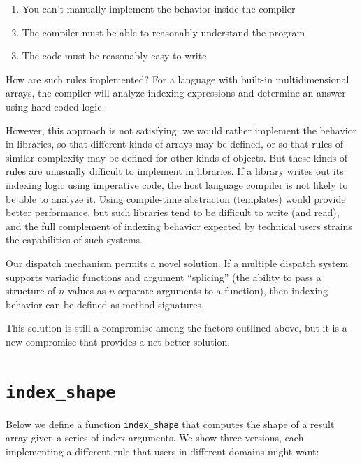 \documentclass[preprint]{sigplanconf}
\begin{document}
\begin{enumerate}
\item You can't manually implement the behavior inside the compiler
\item The compiler must be able to reasonably understand the program
\item The code must be reasonably easy to write
\end{enumerate}

How are such rules implemented? For a language with built-in multidimensional
arrays, the compiler will analyze indexing expressions and determine an answer
using hard-coded logic.


However, this approach is not satisfying: we would rather implement the
behavior in libraries, so that different kinds of arrays may be defined, or so
that rules of similar complexity may be defined for other kinds of objects.
But these kinds of rules are unusually difficult to implement in libraries. If
a library writes out its indexing logic using imperative code, the host
language compiler is not likely to be able to analyze it. Using compile-time
abstracton (templates) would provide better performance, but such libraries
tend to be difficult to write (and read), and the full complement of indexing
behavior expected by technical users strains the capabilities of such systems.


Our dispatch mechanism permits a novel solution. If a multiple dispatch system
supports variadic functions and argument ``splicing'' (the ability to pass a
structure of $n$ values as $n$ separate arguments to a function), then
indexing behavior can be defined as method signatures.

This solution is still a compromise among the factors outlined above, but it
is a new compromise that provides a net-better solution.


\section{\texttt{index\_shape}}

Below we define a function \texttt{index\_shape} that computes the shape of a
result array given a series of index arguments. We show three versions, each
implementing a different rule that users in different domains might want:
\end{document}
